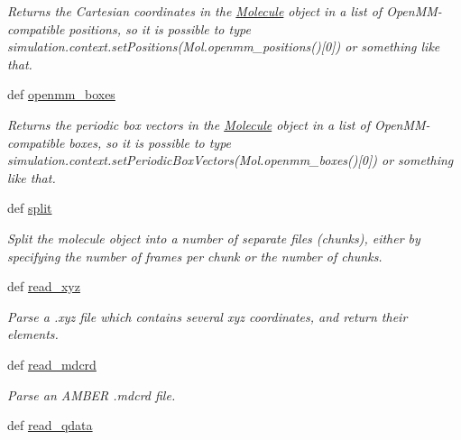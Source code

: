 \begin{DoxyCompactItemize}
\begin{DoxyCompactList}\small\item\em \-Returns the \-Cartesian coordinates in the \hyperlink{classforcebalance_1_1molecule_1_1Molecule}{\-Molecule} object in a list of \-Open\-M\-M-\/compatible positions, so it is possible to type simulation.\-context.\-set\-Positions(\-Mol.\-openmm\-\_\-positions()\mbox{[}0\mbox{]}) or something like that. \end{DoxyCompactList}\item 
def \hyperlink{classforcebalance_1_1molecule_1_1Molecule_aa20a420f4b450bfa9e632fae037ecb01}{openmm\-\_\-boxes}
\begin{DoxyCompactList}\small\item\em \-Returns the periodic box vectors in the \hyperlink{classforcebalance_1_1molecule_1_1Molecule}{\-Molecule} object in a list of \-Open\-M\-M-\/compatible boxes, so it is possible to type simulation.\-context.\-set\-Periodic\-Box\-Vectors(\-Mol.\-openmm\-\_\-boxes()\mbox{[}0\mbox{]}) or something like that. \end{DoxyCompactList}\item 
def \hyperlink{classforcebalance_1_1molecule_1_1Molecule_a71da1c1e530afd8b9b5f08d9bd27259f}{split}
\begin{DoxyCompactList}\small\item\em \-Split the molecule object into a number of separate files (chunks), either by specifying the number of frames per chunk or the number of chunks. \end{DoxyCompactList}\item 
def \hyperlink{classforcebalance_1_1molecule_1_1Molecule_a15a7a0e0377e6dfd52e60c77fbc583c1}{read\-\_\-xyz}
\begin{DoxyCompactList}\small\item\em \-Parse a .xyz file which contains several xyz coordinates, and return their elements. \end{DoxyCompactList}\item 
def \hyperlink{classforcebalance_1_1molecule_1_1Molecule_ab1b56d66b7673b2631e2cee013a80b93}{read\-\_\-mdcrd}
\begin{DoxyCompactList}\small\item\em \-Parse an \-A\-M\-B\-E\-R .mdcrd file. \end{DoxyCompactList}\item 
def \hyperlink{classforcebalance_1_1molecule_1_1Molecule_a1d34af6a7d22dd34850d58efe8595b20}{read\-\_\-qdata}
\item 

\end{DoxyCompactItemize}
